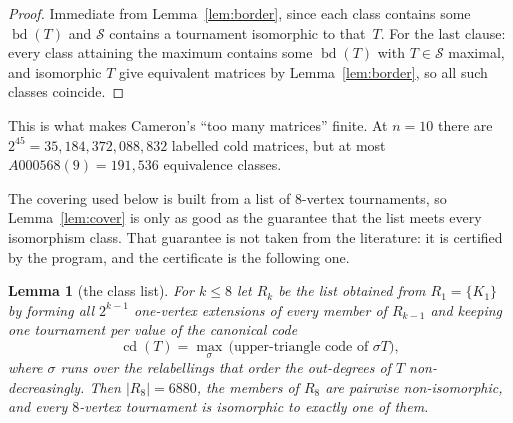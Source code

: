 \documentclass[11pt]{amsart}
\newtheorem{lemma}[theorem]{Lemma}
\theoremstyle{remark}
\begin{document}
\begin{proof}
Immediate from Lemma~\ref{lem:border}, since each class contains some
$\operatorname{bd}(T)$ and $\mathcal S$ contains a tournament isomorphic to that~$T$. For
the last clause: every class attaining the maximum contains some $\operatorname{bd}(T)$
with $T\in\mathcal S$ maximal, and isomorphic $T$ give equivalent matrices by
Lemma~\ref{lem:border}, so all such classes coincide.
\end{proof}

This is what makes Cameron's ``too many matrices'' finite. At $n=10$ there are
$2^{45}=35{,}184{,}372{,}088{,}832$ labelled cold matrices, but at most
$A000568(9)=191{,}536$ equivalence classes.

The covering used below is built from a list of $8$-vertex tournaments, so Lemma~\ref{lem:cover}
is only as good as the guarantee that the list meets every isomorphism class. That guarantee is
not taken from the literature: it is certified by the program, and the certificate is the
following one.

\begin{lemma}[the class list]\label{lem:classlist}
For $k\le 8$ let $R_k$ be the list obtained from $R_1=\{K_1\}$ by forming all $2^{k-1}$
one-vertex extensions of every member of $R_{k-1}$ and keeping one tournament per value of the
canonical code
\[
  \operatorname{cd}(T)=\max_{\sigma}\,\bigl(\text{upper-triangle code of }\sigma T\bigr),
\]
where $\sigma$ runs over the relabellings that order the out-degrees of $T$
non-decreasingly. Then $|R_8|=6880$, the members of $R_8$ are
pairwise non-isomorphic, and every $8$-vertex tournament is isomorphic to exactly one of them.
\end{lemma}
\end{document}

